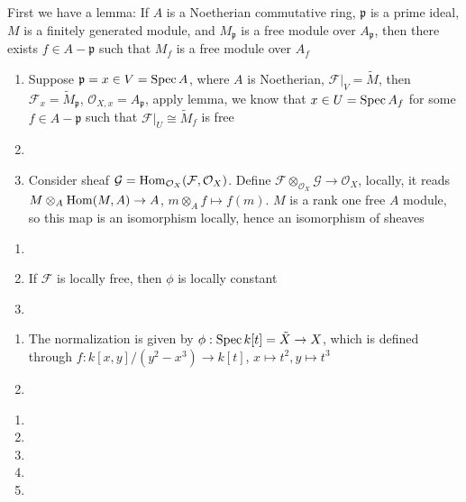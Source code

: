\documentclass[a4paper,10pt]{article}
\begin{document}
\begin{problem}
First we have a lemma: If $A$ is a Noetherian commutative ring, $\mathfrak p$ is a prime ideal, $M$ is a finitely generated module, and $M_{\mathfrak p}$ is a free module over $A_{\mathfrak p}$, then there exists $f\in A-\mathfrak p$ such that $M_f$ is a free module over $A_f$
\begin{enumerate}
\item Suppose $\mathfrak p=x\in V=\operatorname{Spec} A$, where $A$ is Noetherian, $\mathcal F|_V=\tilde M$, then $\mathcal F_x=\tilde M_{\mathfrak p}$, $\mathcal O_{X,x}=A_{\mathfrak p}$, apply lemma, we know that $x\in U=\operatorname{Spec} A_f$ for some $f\in A-\mathfrak p$ such that $\mathcal F|_{U}\cong\tilde M_f$ is free
\item 
\item Consider sheaf $\mathcal G=\operatorname{Hom}_{\mathcal O_X}(\mathcal F,\mathcal O_X)$. Define $\mathcal F\otimes_{\mathcal O_X}\mathcal G\to\mathcal O_X$, locally, it reads $M\otimes_A\operatorname{Hom}(M,A)\to A$, $m\otimes_Af\mapsto f(m)$. $M$ is a rank one free $A$ module, so this map is an isomorphism locally, hence an isomorphism of sheaves
\end{enumerate}
\end{problem}

\begin{problem}
\begin{enumerate}
\item 
\item If $\mathcal F$ is locally free, then $\phi$ is locally constant
\item 
\end{enumerate}
\end{problem}

\begin{problem}
\begin{enumerate}
\item The normalization is given by $\phi:\operatorname{Spec} k[t]=\tilde X\to X$, which is defined through $f:k[x,y]/(y^2-x^3)\to k[t]$, $x\mapsto t^2,y\mapsto t^3$
\item 
\end{enumerate}
\end{problem}

\begin{problem}
\begin{enumerate}
\item 
\item 
\item 
\item 
\item 
\end{enumerate}
\end{problem}
\end{document}
